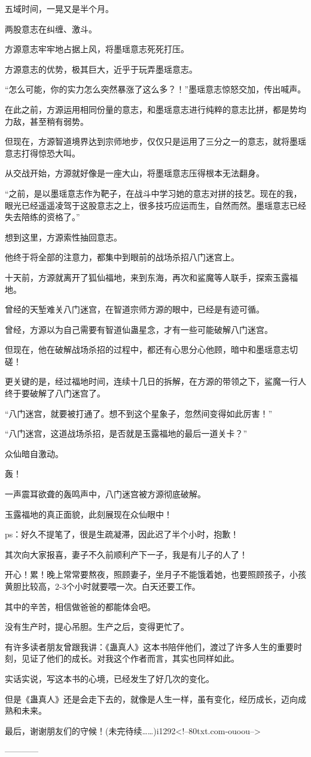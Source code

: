 \begin{this_body}
五域时间，一晃又是半个月。

两股意志在纠缠、激斗。

方源意志牢牢地占据上风，将墨瑶意志死死打压。

方源意志的优势，极其巨大，近乎于玩弄墨瑶意志。

“怎么可能，你的实力怎么突然暴涨了这么多？！”墨瑶意志惊怒交加，传出喊声。

在此之前，方源运用相同份量的意志，和墨瑶意志进行纯粹的意志比拼，都是势均力敌，甚至稍有弱势。

但现在，方源智道境界达到宗师地步，仅仅只是运用了三分之一的意志，就将墨瑶意志打得惊恐大叫。

从交战开始，方源就好像是一座大山，将墨瑶意志压得根本无法翻身。

“之前，是以墨瑶意志作为靶子，在战斗中学习她的意志对拼的技艺。现在的我，眼光已经遥遥凌驾于这股意志之上，很多技巧应运而生，自然而然。墨瑶意志已经失去陪练的资格了。”

想到这里，方源索性抽回意志。

他终于将全部的注意力，都集中到眼前的战场杀招八门迷宫上。

十天前，方源就离开了狐仙福地，来到东海，再次和鲨魔等人联手，探索玉露福地。

曾经的天堑难关八门迷宫，在智道宗师方源的眼中，已经是有迹可循。

曾经，方源以为自己需要有智道仙蛊星念，才有一些可能破解八门迷宫。

但现在，他在破解战场杀招的过程中，都还有心思分心他顾，暗中和墨瑶意志切磋！

更关键的是，经过福地时间，连续十几日的拆解，在方源的带领之下，鲨魔一行人终于要破解了八门迷宫了。

“八门迷宫，就要被打通了。想不到这个星象子，忽然间变得如此厉害！”

“八门迷宫，这道战场杀招，是否就是玉露福地的最后一道关卡？”

众仙暗自激动。

轰！

一声震耳欲聋的轰鸣声中，八门迷宫被方源彻底破解。

玉露福地的真正面貌，此刻展现在众仙眼中！

ps：好久不提笔了，很是生疏凝滞，因此迟了半个小时，抱歉！

其次向大家报喜，妻子不久前顺利产下一子，我是有儿子的人了！

开心！累！晚上常常要熬夜，照顾妻子，坐月子不能饿着她，也要照顾孩子，小孩黄胆比较高，2-3个小时就要喂一次。白天还要工作。

其中的辛苦，相信做爸爸的都能体会吧。

没有生产时，提心吊胆。生产之后，变得更忙了。

有许多读者朋友曾跟我讲：《蛊真人》这本书陪伴他们，渡过了许多人生的重要时刻，见证了他们的成长。对我这个作者而言，其实也同样如此。

实话实说，写这本书的心境，已经发生了好几次的变化。

但是《蛊真人》还是会走下去的，就像是人生一样，虽有变化，经历成长，迈向成熟和未来。

最后，谢谢朋友们的守候！(未完待续……)i1292<!--80txt.com-ouoou-->

------------

\end{this_body}

